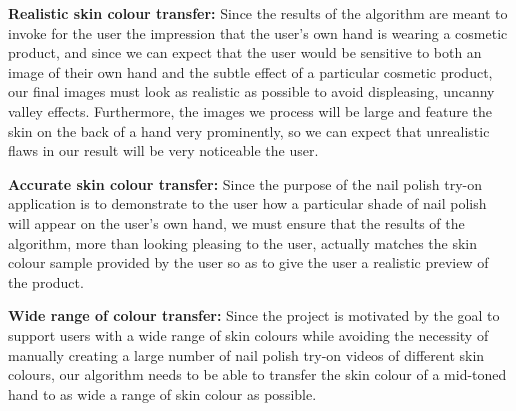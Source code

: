 \textbf{Realistic skin colour transfer:}
Since the results of the algorithm are meant to invoke for the user the impression that the user's own hand is wearing a cosmetic product, and since we can expect that the user would be sensitive to both an image of their own hand and the subtle effect of a particular cosmetic product, our final images must look as realistic as possible to avoid displeasing, uncanny valley effects. Furthermore, the images we process will be large and feature the skin on the back of a hand very prominently, so we can expect that unrealistic flaws in our result will be very noticeable the user.

\textbf{Accurate skin colour transfer:} 
Since the purpose of the nail polish try-on application is to demonstrate to the user how a particular shade of nail polish will appear on the user's own hand, we must ensure that the results of the algorithm, more than looking pleasing to the user, actually matches the skin colour sample provided by the user so as to give the user a realistic preview of the product.

\textbf{Wide range of colour transfer:} Since the project is motivated by the goal to support users with a wide range of skin colours while avoiding the necessity of manually creating a large number of nail polish try-on videos of different skin colours, our algorithm needs to be able to transfer the skin colour of a mid-toned hand to as wide a range of skin colour as possible.